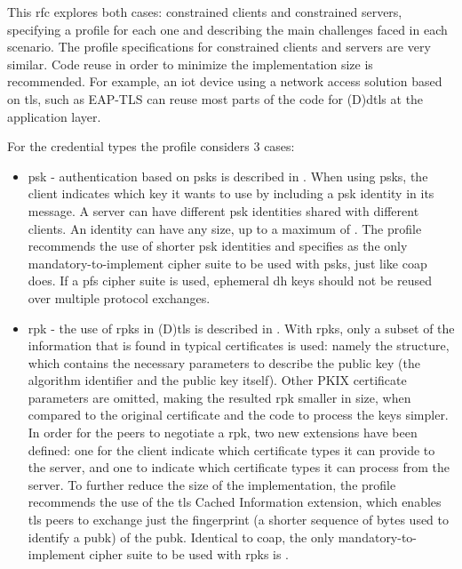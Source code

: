 \documentclass{llncs}
\begin{document}
This \gls{rfc} explores both cases: constrained clients and constrained servers, specifying
a profile for each one and describing the main challenges faced in each scenario.
The profile specifications for constrained clients and servers are very similar.
Code reuse in order to minimize the implementation size is recommended. For example, an \gls{iot} device
using a network access solution based on \gls{tls}, such as EAP-TLS\cite{rfc5216}
can reuse most parts of the code for (D)\gls{dtls} at the application layer.

For the credential types the profile considers 3 cases:

\begin{itemize}
  \item \gls{psk} - authentication based on \gls{psk}s is described in
  \cite{RFC4279}. When using \gls{psk}s, the client indicates which
  key it wants to use by including a \gls{psk} identity in its  message.
  A server can have different \gls{psk} identities shared with different clients.
  An identity can have any size, up to a maximum of .
  The profile recommends the use of shorter \gls{psk} identities and specifies
   as the only mandatory-to-implement
  cipher suite to be used with \gls{psk}s, just like \gls{coap} does. If a \gls{pfs} cipher suite is used, ephemeral
  \gls{dh} keys should not be reused over multiple protocol exchanges.

  \item \gls{rpk} - the use of \gls{rpk}s in (D)\gls{tls} is described in \cite{RFC7250}.
  With \gls{rpk}s, only a subset of the information that is found in typical certificates
  is used: namely the  structure, which contains
  the necessary parameters to describe the public key (the algorithm identifier
  and the public key itself). Other PKIX certificate\cite{RFCabc} parameters are
  omitted, making the resulted \gls{rpk} smaller in size, when compared to the
  original certificate and the code to process the keys simpler. In order for the
  peers to negotiate a \gls{rpk}, two new extensions have been defined:
  one for the client indicate which certificate types it can provide to the server, and one to indicate which certificate types it can process from the server. To further reduce the size of the implementation, the profile
  recommends the use of the \gls{tls} Cached Information extension\cite{RFC7924}, which
  enables \gls{tls} peers to exchange just the fingerprint (a shorter sequence of bytes
  used to identify a \gls{pubk}) of the \gls{pubk}. Identical to \gls{coap}, the only mandatory-to-implement
  cipher suite to be used with \gls{rpk}s is .


\end{itemize}
\end{document}

